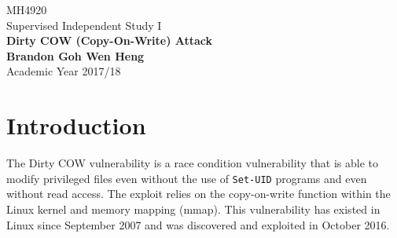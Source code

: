 \documentclass[a4paper,12pt]{article}
\begin{document}
	\begin{titlepage}
		\begin{center}
			\vspace*{9em}
			\Huge 
			MH4920\\ Supervised Independent Study I\\
			\vspace*{4em}
			\LARGE
			\textbf{Dirty COW (Copy-On-Write) Attack}\\		
			\vspace{4em}
			\textbf{Brandon Goh Wen Heng}\\
			\vspace*{4em}
			Academic Year 2017/18
			\vfill
		\end{center}
	\end{titlepage}
	
	\tableofcontents
	\newpage
	\section{Introduction}
The Dirty COW vulnerability is a race condition vulnerability that is able to modify privileged files even without the use of \texttt{Set-UID} programs and even without read access. The exploit relies on the copy-on-write function within the Linux kernel and memory mapping (mmap). This vulnerability has existed in Linux since September 2007 and was discovered and exploited in October 2016.
\end{document}
